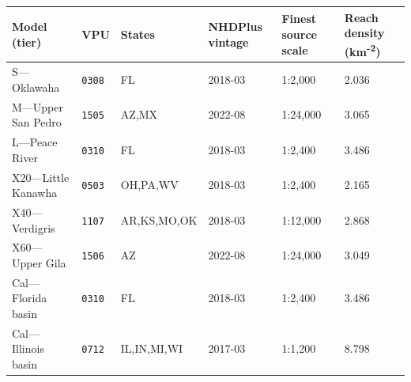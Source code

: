 \begin{tabular}{@{}p{3.1cm}p{1.0cm}p{2.0cm}p{1.7cm}p{1.6cm}p{1.7cm}@{}}
\toprule
Model (tier) & VPU & States & NHDPlus vintage & Finest source scale & Reach density (km\textsuperscript{-2}) \\
\midrule
S---Oklawaha & \texttt{0308} & FL & 2018-03 & 1:2,000 & 2.036 \\
M---Upper San Pedro & \texttt{1505} & AZ,MX & 2022-08 & 1:24,000 & 3.065 \\
L---Peace River & \texttt{0310} & FL & 2018-03 & 1:2,400 & 3.486 \\
X20---Little Kanawha & \texttt{0503} & OH,PA,WV & 2018-03 & 1:2,400 & 2.165 \\
X40---Verdigris & \texttt{1107} & AR,KS,MO,OK & 2018-03 & 1:12,000 & 2.868 \\
X60---Upper Gila & \texttt{1506} & AZ & 2022-08 & 1:24,000 & 3.049 \\
Cal---Florida basin & \texttt{0310} & FL & 2018-03 & 1:2,400 & 3.486 \\
Cal---Illinois basin & \texttt{0712} & IL,IN,MI,WI & 2017-03 & 1:1,200 & 8.798 \\
\bottomrule
\end{tabular}
